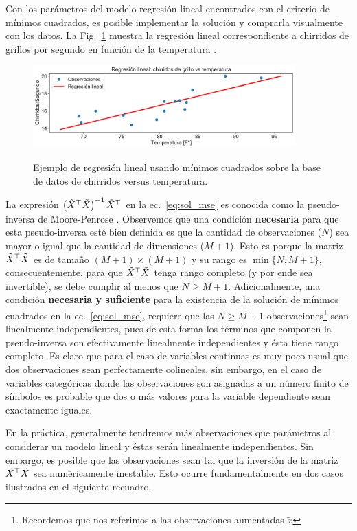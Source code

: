 Con los parámetros del modelo regresión lineal encontrados con el criterio de mínimos cuadrados, es posible implementar la solución y comprarla visualmente con los datos. La Fig.~\ref{fig:reg_lin_1} muestra la regresión lineal correspondiente a chirridos de grillos por segundo en función de la temperatura \cite{insects}. 

\begin{figure}[H]
	\centering
	\includegraphics[width=0.9\textwidth]{img/cap1_chirridos.pdf}\\
	\caption{Ejemplo de regresión lineal usando mínimos cuadrados sobre la base de datos de chirridos versus temperatura.}
	\label{fig:reg_lin_1}
\end{figure}

La expresión $\left(\tilde{X}^\top\tilde{X} \right)^{-1} \tilde{X}^\top$ en la ec.~\eqref{eq:sol_mse} es conocida como la pseudo-inversa de Moore-Penrose \cite[p.~7]{benisrael_greville_2006}. Observemos que una condición \textbf{necesaria} para que esta pseudo-inversa esté bien definida es que la cantidad de observaciones ($N$) sea mayor o igual que la cantidad de dimensiones ($M+1$). Esto es porque la matriz $\tilde{X}^\top\tilde{X}$ es de tamaño $(M+1)\times(M+1)$ y su rango es $\min \{N, M+1\}$, consecuentemente, para que $\tilde{X}^\top\tilde{X}$ tenga rango completo (y por ende sea invertible), se debe cumplir al menos que $N\geq M+1$. Adicionalmente, una condición \textbf{necesaria y suficiente}  para la existencia de la solución de mínimos cuadrados en la ec.~\eqref{eq:sol_mse}, requiere que las $N\geq M+1$ observaciones\footnote{Recordemos que nos referimos a las observaciones aumentadas $\tilde{x}$} sean linealmente independientes, pues de esta forma los términos que componen la pseudo-inversa son efectivamente linealmente independientes y ésta tiene rango completo. Es claro que para el caso de variables continuas es muy poco usual que dos observaciones sean perfectamente colineales, sin embargo, en el caso de variables categóricas donde las observaciones son asignadas a un número finito de símbolos es probable que dos o más valores para la variable dependiente sean exactamente iguales. 

En la práctica, generalmente tendremos más observaciones que parámetros al considerar un modelo lineal y éstas serán linealmente independientes. Sin embargo, es posible que las observaciones sean tal que la inversión de la matriz  $\tilde{X}^\top\tilde{X}$ sea numéricamente  inestable. Esto ocurre fundamentalmente en dos casos ilustrados en el siguiente recuadro.  

